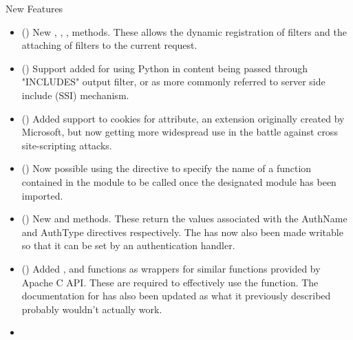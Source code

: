 
  New Features

  \begin{itemize}
    \item
      ()
      New , ,
      , 
      methods. These allows the dynamic registration of filters and the
      attaching of filters to the current request.
    \item
      ()
      Support added for using Python in content being passed through "INCLUDES"
      output filter, or as more commonly referred to server side include (SSI)
      mechanism.
    \item
      ()
      Added support to cookies for  attribute, an extension
      originally created by Microsoft, but now getting more widespread use
      in the battle against cross site-scripting attacks.
    \item
      ()
      Now possible using the  directive to specify the name
      of a function contained in the module to be called once the designated
      module has been imported.
    \item
      ()
      New  and  methods.
      These return the values associated with the AuthName and AuthType
      directives respectively. The  has now also
      been made writable so that it can be set by an authentication
      handler.
    \item
      ()
      Added ,  and
       functions as wrappers for similar functions
      provided by Apache C API. These are required to effectively use the
       function. The documentation for
       has also been updated as what it
      previously described probably wouldn't actually work.
    \item

\end{itemize}
